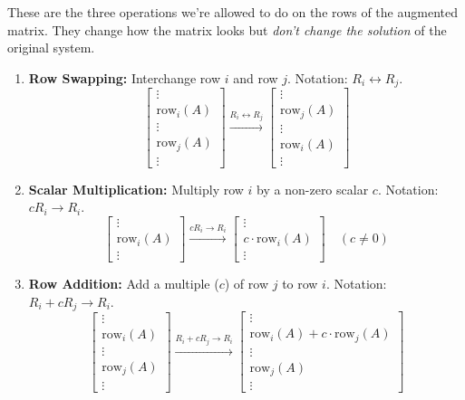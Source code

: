 \documentclass[11pt]{article}
\begin{document}
These are the three operations we're allowed to do on the rows of the augmented matrix. They change how the matrix looks but \textit{don't change the solution} of the original system.
\begin{enumerate}
    \item \textbf{Row Swapping:} Interchange row $i$ and row $j$. Notation: $R_i \leftrightarrow R_j$.
    \[ \left[\begin{array}{c} \vdots \\ \text{row}_i(A) \\ \vdots \\ \text{row}_j(A) \\ \vdots \end{array}\right] \xrightarrow{R_i \leftrightarrow R_j} \left[\begin{array}{c} \vdots \\ \text{row}_j(A) \\ \vdots \\ \text{row}_i(A) \\ \vdots \end{array}\right] \]
    \item \textbf{Scalar Multiplication:} Multiply row $i$ by a non-zero scalar $c$. Notation: $c R_i \to R_i$.
    \[ \left[\begin{array}{c} \vdots \\ \text{row}_i(A) \\ \vdots \end{array}\right] \xrightarrow{c R_i \to R_i} \left[\begin{array}{c} \vdots \\ c \cdot \text{row}_i(A) \\ \vdots \end{array}\right] \quad (c \neq 0) \]
    \item \textbf{Row Addition:} Add a multiple ($c$) of row $j$ to row $i$. Notation: $R_i + c R_j \to R_i$.
    \[ \left[\begin{array}{c} \vdots \\ \text{row}_i(A) \\ \vdots \\ \text{row}_j(A) \\ \vdots \end{array}\right] \xrightarrow{R_i + c R_j \to R_i} \left[\begin{array}{c} \vdots \\ \text{row}_i(A)+c \cdot \text{row}_j(A) \\ \vdots \\ \text{row}_j(A) \\ \vdots \end{array}\right] \]
\end{enumerate}
\end{document}
